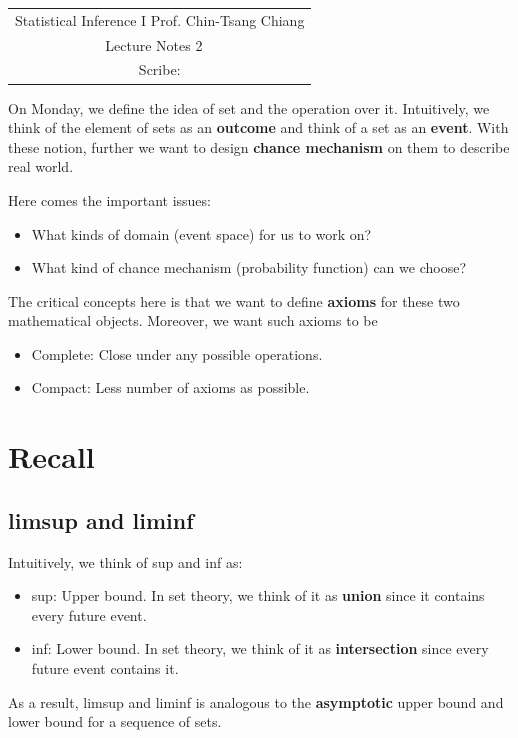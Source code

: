 \documentclass[../Probability_Theory.tex]{subfiles}
\begin{document}
	\begin{center}
		\renewcommand{\arraystretch}{2}
		\begin{bfseries}
			\begin{tabular}{|c|}
				\hline
				Statistical Inference I \hfill Prof. Chin-Tsang Chiang\\
				\hspace{15em} {\large Lecture Notes 2} \hspace{15em}\ \\
				\lecdate \hfill Scribe: \scribe\\
				\hline
			\end{tabular}
			\renewcommand{\arraystretch}{1}
		\end{bfseries}
	\end{center}
On Monday, we define the idea of set and the operation over it. Intuitively, we think of the element of sets as an {\bf outcome} and think of a set as an {\bf event}. With these notion, further we want to design {\bf chance mechanism} on them to describe real world.

Here comes the important issues:
\begin{itemize}
	\item What kinds of domain (event space) for us to work on?
	\item What kind of chance mechanism (probability function) can we choose?
\end{itemize}
The critical concepts here is that we want to define {\bf axioms} for these two mathematical objects. Moreover, we want such axioms to be
\begin{itemize}
	\item Complete: Close under any possible operations.
	\item Compact: Less number of axioms as possible.
\end{itemize}

\section{Recall}
\subsection{limsup and liminf}
Intuitively, we think of sup and inf as:
\begin{itemize}
	\item sup: Upper bound. In set theory, we think of it as {\bf union} since it contains every future event.
	\item inf: Lower bound. In set theory, we think of it as {\bf intersection} since every future event contains it.
\end{itemize}
As a result, limsup and liminf is analogous to the {\bf asymptotic} upper bound and lower bound for a sequence of sets.
\end{document}
